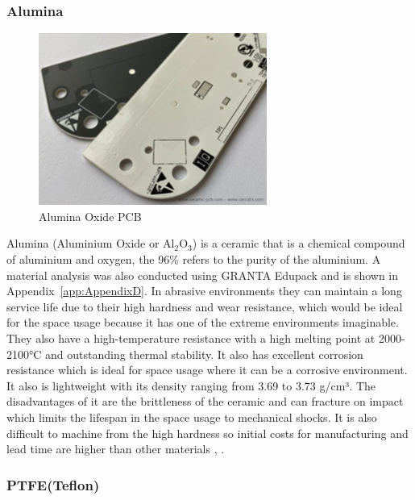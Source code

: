 \subsubsection{Alumina}

\begin{figure}[htbp]
    \centering
    \includegraphics[width=7.5cm]{chapters/methodology/MaterialAnalysis/Fig2AluminaPCB.png}
    \caption{Alumina Oxide PCB \cite{RefWorks:cercuits2025aluminum}}
    \label{fig:alumina-pcb}
\end{figure}
Alumina (Aluminium Oxide or Al$_2$O$_3$) is a ceramic that is a chemical compound of aluminium and oxygen, the 96\% refers to the purity of the aluminium.
A material analysis was also conducted using GRANTA Edupack and is shown in Appendix~\ref{app:AppendixD}. 
In abrasive environments they can maintain a long service life due to their high hardness and wear resistance, which would be ideal for the space usage because it has one of the extreme environments imaginable. 
They also have a high-temperature resistance with a high melting point at 2000-2100°C and outstanding thermal stability. 
It also has excellent corrosion resistance which is ideal for space usage where it can be a corrosive environment. 
It also is lightweight with its density ranging from 3.69 to 3.73 g/cm³. 
The disadvantages of it are the brittleness of the ceramic and can fracture on impact which limits the lifespan in the space usage to mechanical shocks. 
It is also difficult to machine from the high hardness so initial costs for manufacturing and lead time are higher than other materials \cite{RefWorks:mascera-tec}, \cite{RefWorks:Vhandy}.

\subsubsection{PTFE(Teflon)}

